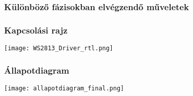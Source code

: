 \subsubsection{Különböző fázisokban elvégzendő műveletek}



\subsubsection{Kapcsolási rajz}

\texttt{[image: WS2813\_Driver\_rtl.png]}

\subsubsection{Állapotdiagram}

\texttt{[image: allapotdiagram\_final.png]}

